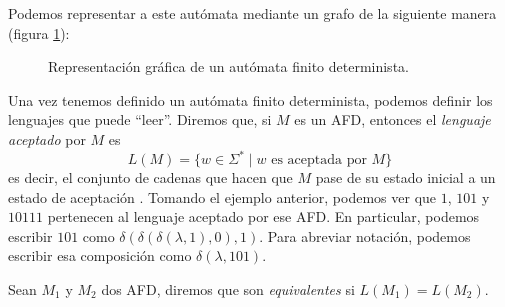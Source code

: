 Podemos representar a este autómata mediante un grafo de la siguiente manera (figura \ref{fig:afd}):

\begin{figure}[h!]
\centering
{}
\caption{Representación gráfica de un autómata finito determinista.}\label{fig:afd}
\end{figure}

Una vez tenemos definido un autómata finito determinista, podemos definir los lenguajes que puede ``leer''. Diremos 
que, si $M$ es un AFD, entonces el \textit{lenguaje aceptado} por $M$ es
\begin{equation}
    L(M)=\{w\in \Sigma^*\mid w\text{ es aceptada por }M\}
\end{equation}
es decir, el conjunto de cadenas que hacen que $M$ pase de su estado inicial a un estado de aceptación 
\cite{kelley_2001}. Tomando el ejemplo anterior, podemos ver que $1$, $101$ y $10111$ pertenecen al lenguaje aceptado 
por ese AFD. En particular, podemos escribir $101$ como $\delta(\delta(\delta(\lambda,1),0),1)$. Para abreviar 
notación, podemos escribir esa composición como $\delta(\lambda,101)$.

\begin{definicion}Sean $M_1$ y $M_2$ dos AFD, diremos que son \textit{equivalentes} si $L(M_1)=L(M_2)$.
\end{definicion}

